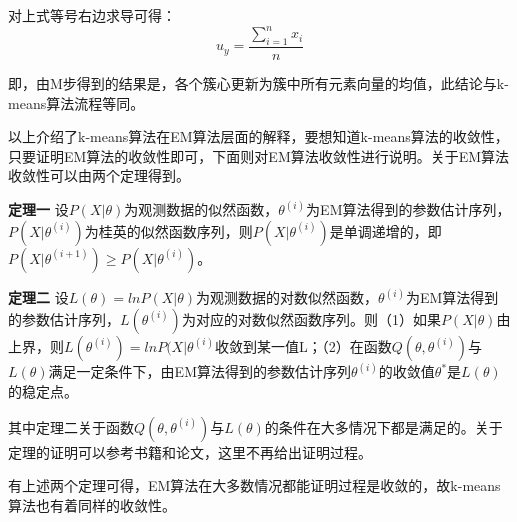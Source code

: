 对上式等号右边求导可得：
$$u_y=\frac{\sum_{i=1}^n{x_i}}{n}$$

即，由M步得到的结果是，各个簇心更新为簇中所有元素向量的均值，此结论与k-means算法流程等同。

以上介绍了k-means算法在EM算法层面的解释，要想知道k-means算法的收敛性，只要证明EM算法的收敛性即可，下面则对EM算法收敛性进行说明。关于EM算法收敛性可以由两个定理得到。

\textbf{定理一} 设$P(X|\theta)$为观测数据的似然函数，$\theta^{(i)}$为EM算法得到的参数估计序列，$P(X|\theta^{(i)})$为桂英的似然函数序列，则$P(X|\theta^{(i)})$是单调递增的，即$P\left( X|\theta ^{\left( i+1 \right)} \right) \geqslant P\left( X|\theta ^{\left( i \right)} \right) $。

\textbf{定理二} 设$L(\theta)=lnP(X|\theta)$为观测数据的对数似然函数，$\theta^{(i)}$为EM算法得到的参数估计序列，$L(\theta^{(i)})$为对应的对数似然函数序列。则（1）如果$P(X|\theta)$由上界，则$L(\theta^{(i)})=lnP(X|\theta^{(i)}$收敛到某一值L；（2）在函数$Q(\theta,\theta^{(i)})$与$L(\theta)$满足一定条件下，由EM算法得到的参数估计序列$\theta^{(i)}$的收敛值$\theta^{*}$是$L(\theta)$的稳定点。

其中定理二关于函数$Q(\theta,\theta^{(i)})$与$L(\theta)$的条件在大多情况下都是满足的。关于定理的证明可以参考书籍\cite{李航2012统计学习方法}和论文\cite{neal1998view}，这里不再给出证明过程。

有上述两个定理可得，EM算法在大多数情况都能证明过程是收敛的，故k-means算法也有着同样的收敛性。